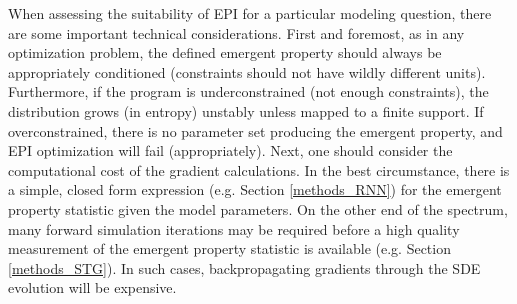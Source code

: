 \documentclass[11pt]{article}
\begin{document}
When assessing the suitability of EPI for a particular modeling question, there are some important technical considerations. 
First and foremost, as in any optimization problem, the defined emergent property should always be appropriately conditioned (constraints should not have wildly different units).  
Furthermore, if the program is underconstrained (not enough constraints), the distribution grows (in entropy) unstably unless mapped to a finite support.  
If overconstrained, there is no parameter set producing the emergent property, and EPI optimization will fail (appropriately).
Next, one should consider the computational cost of the gradient calculations. 
In the best circumstance, there is a simple, closed form expression (e.g. Section \ref{methods_RNN}) for the emergent property statistic given the model parameters.  
On the other end of the spectrum, many forward simulation iterations may be required before a high quality measurement of the emergent property statistic is available  (e.g. Section \ref{methods_STG}).  
In such cases, backpropagating gradients through the SDE evolution will be expensive.
\end{document}
